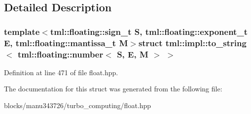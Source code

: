 \subsection{Detailed Description}
\subsubsection*{template$<$tml\+::floating\+::sign\+\_\+t S, tml\+::floating\+::exponent\+\_\+t E, tml\+::floating\+::mantissa\+\_\+t M$>$struct tml\+::impl\+::to\+\_\+string$<$ tml\+::floating\+::number$<$ S, E, M $>$ $>$}



Definition at line 471 of file float.\+hpp.



The documentation for this struct was generated from the following file\+:\begin{DoxyCompactItemize}
\item 
blocks/manu343726/turbo\+\_\+computing/float.\+hpp\end{DoxyCompactItemize}

